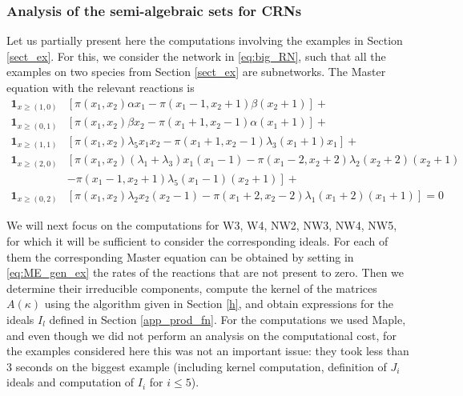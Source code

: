 \documentclass{amsart}
\theoremstyle{definition}
\theoremstyle{remark}
\theoremstyle{Conjecture/open problem}
\theoremstyle{assumption}
\theoremstyle{conjecture}
\def\1{\mathbf{1}}
\numberwithin{equation}{section}
\begin{document}
\subsubsection{Analysis of the semi-algebraic sets for CRNs}
Let us partially present here the computations involving the examples in Section \ref{sect_ex}. For this, we consider the network in \eqref{eq:big_RN}, such that all the examples on two species from Section \ref{sect_ex} are subnetworks. The Master equation with the relevant reactions is
\begin{align}\label{eq:ME_gen_ex}
\1_{x\geq (1,0)} & \left[ \pi (x_1,x_2)\alpha x_1-\pi (x_1-1,x_2+1)\beta (x_2+1)\right] + \\
\1_{x\geq (0,1)} & \left[ \pi (x_1,x_2)\beta x_2 -\pi (x_1+1,x_2-1)\alpha (x_1+1)\right] + \nonumber \\
\1_{x\geq (1,1)} & \left[ \pi (x_1,x_2)\lambda _5x_1x_2-\pi (x_1+1,x_2-1)\lambda _3(x_1+1)x_1\right] +\nonumber \\
\1_{x\geq (2,0)} & \left[ \pi (x_1,x_2)(\lambda _1+\lambda _3)x_1(x_1-1)-\pi (x_1-2,x_2+2)\lambda _2(x_2+2)(x_2+1) \right. \nonumber \\
& \left. -\pi (x_1-1,x_2+1)\lambda _5(x_1-1)(x_2+1)\right] + \nonumber \\
\1_{x\geq (0,2)} & \left[ \pi (x_1,x_2)\lambda _2x_2(x_2-1)-\pi (x_1+2,x_2-2)\lambda _1(x_1+2)(x_1+1)\right] =0 \nonumber
\end{align}

We will next focus on the computations for W3, W4, NW2, NW3, NW4, NW5, for which it will be sufficient to consider the corresponding ideals. For each of them the corresponding Master equation can be obtained by setting in \eqref{eq:ME_gen_ex} the rates of the  reactions that are not present to zero. Then we determine their irreducible components, compute the kernel of the matrices $A(\kappa )$ using the algorithm given in Section \ref{h}, and obtain expressions for the ideals $I_l$ defined in Section \ref{app_prod_fn}. For the computations we used Maple, and even though we did not perform an analysis on the computational cost, for the examples considered here this was not an important issue: they took less than 3 seconds on the biggest example (including kernel computation, definition of $J_i$ ideals and computation of $I_i$ for $i\leq 5$). 
\end{document}
